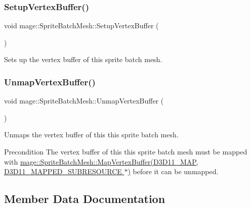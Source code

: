 \subsubsection{\texorpdfstring{Setup\+Vertex\+Buffer()}{SetupVertexBuffer()}}
{\footnotesize\ttfamily void mage\+::\+Sprite\+Batch\+Mesh\+::\+Setup\+Vertex\+Buffer (\begin{DoxyParamCaption}{ }\end{DoxyParamCaption})\hspace{0.3cm}{\ttfamily [private]}}

Sets up the vertex buffer of this sprite batch mesh. \hypertarget{classmage_1_1_sprite_batch_mesh_a48ed983397a37a5874101b49c040b78c}{}\label{classmage_1_1_sprite_batch_mesh_a48ed983397a37a5874101b49c040b78c} 
\subsubsection{\texorpdfstring{Unmap\+Vertex\+Buffer()}{UnmapVertexBuffer()}}
{\footnotesize\ttfamily void mage\+::\+Sprite\+Batch\+Mesh\+::\+Unmap\+Vertex\+Buffer (\begin{DoxyParamCaption}{ }\end{DoxyParamCaption})}

Unmaps the vertex buffer of this this sprite batch mesh.

\begin{DoxyPrecond}{Precondition}
The vertex buffer of this this sprite batch mesh must be mapped with \hyperlink{classmage_1_1_sprite_batch_mesh_ab790dbbd3cb685c1f14d7ca1e9ed639b}{mage\+::\+Sprite\+Batch\+Mesh\+::\+Map\+Vertex\+Buffer(\+D3\+D11\+\_\+\+M\+A\+P, D3\+D11\+\_\+\+M\+A\+P\+P\+E\+D\+\_\+\+S\+U\+B\+R\+E\+S\+O\+U\+R\+C\+E $\ast$)} before it can be unmapped. 
\end{DoxyPrecond}


\subsection{Member Data Documentation}
\hypertarget{classmage_1_1_sprite_batch_mesh_a9560987925304ec757cac212d8b921f5}{}\label{classmage_1_1_sprite_batch_mesh_a9560987925304ec757cac212d8b921f5} 
